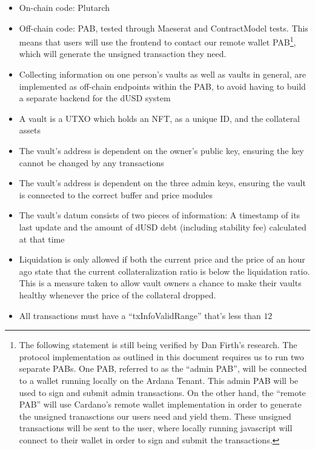 \documentclass{article} %
\begin{document}

\begin{itemize}
  \item On-chain code: Plutarch
  \item Off-chain code: PAB, tested through Maeserat and ContractModel tests.
    This means that users will use the frontend to contact our remote wallet
    PAB\footnote{
      The following statement is still being verified by Dan Firth's research.
      The protocol implementation as outlined in this document requires us to
      run two separate PABs.
      One PAB, referred to as the ``admin PAB'', will be connected to a wallet
      running locally on the Ardana Tenant.
      This admin PAB will be used to sign and submit admin transactions.
      On the other hand, the ``remote PAB'' will use Cardano's remote wallet
      implementation in order to generate the unsigned tranasctions our users
      need and yield them.
      These unsigned transactions will be sent to the user, where locally
      running javascript will connect to their wallet in order to sign and
      submit the transactions.
    }, which will generate the unsigned transaction they need.
  \item Collecting information on one person's vaults as well as vaults in
    general, are implemented as off-chain endpoints within the PAB, to avoid
    having to build a separate backend for the dUSD system
  \item A vault is a UTXO which holds an NFT, as a unique ID, and the collateral
    assets
  \item The vault's address is dependent on the owner's public key, ensuring the
    key cannot be changed by any transactions
  \item The vault's address is dependent on the three admin keys, ensuring the
    vault is connected to the correct buffer and price modules
  \item The vault's datum consists of two pieces of information: A timestamp of
    its last update and the amount of dUSD debt (including stability fee)
    calculated at that time
  \item Liquidation is only allowed if both the current price and the price of
    an hour ago state that the current collateralization ratio is below the
    liquidation ratio.
    This is a measure taken to allow vault owners a chance to make their vaults
    healthy whenever the price of the collateral dropped.
  \item All transactions must have a ``txInfoValidRange'' that's less than $12$

\end{itemize}
\end{document}
